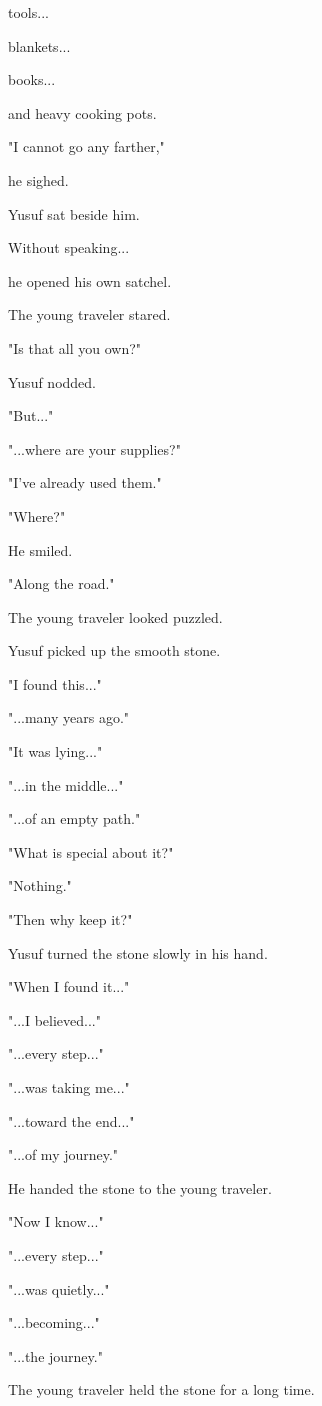 \documentclass[12pt,openany]{book}
\begin{document}
tools...

blankets...

books...

and heavy cooking pots.

"I cannot go any farther,"

he sighed.

Yusuf sat beside him.

Without speaking...

he opened his own satchel.

The young traveler stared.

"Is that all you own?"

Yusuf nodded.

"But..."

"...where are your supplies?"

"I've already used them."

"Where?"

He smiled.

"Along the road."

The young traveler looked puzzled.

Yusuf picked up the smooth stone.

"I found this..."

"...many years ago."

"It was lying..."

"...in the middle..."

"...of an empty path."

"What is special about it?"

"Nothing."

"Then why keep it?"

Yusuf turned the stone slowly in his hand.

"When I found it..."

"...I believed..."

"...every step..."

"...was taking me..."

"...toward the end..."

"...of my journey."

He handed the stone to the young traveler.

"Now I know..."

"...every step..."

"...was quietly..."

"...becoming..."

"...the journey."

The young traveler held the stone for a long time.
\end{document}

